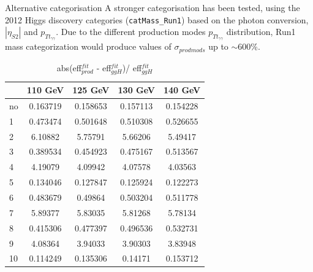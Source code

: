 \documentclass[10pt,UKenglish, leqno, xcolor = dvipsnames]{beamer}
\begin{document}
		\begin{frame}{Alternative categorisation}
			A stronger categorisation has been tested, using the 2012 Higgs discovery categories (\texttt{catMass\_Run1}) based on the photon conversion, $|\eta_{S2}|$ and $p_{Tt_{\gamma\gamma}}$. Due to the different production modes $p_{Tt_{\gamma\gamma}}$ distribution, Run1 mass categorization would produce values of $\sigma_{prod mods}$ up to $\sim$600\%.
			\begin{table}[tbp]
				\centering
				\small
				\begin{tabular}{lcccc}
					\toprule[1.5pt]
					& 110 GeV	& 125 GeV	& 130 GeV	& 140 GeV	\\
					\midrule
					no & 0.163719 & 0.158653 & 0.157113 & 0.154228	\\
					1 & 0.473474 & 0.501648 & 0.510308 & 0.526655	\\
					2 & 6.10882 & 5.75791 & 5.66206 & 5.49417		\\
					3 & 0.389534 & 0.454923 & 0.475167 & 0.513567	\\
					4 & 4.19079 & 4.09942 & 4.07578 & 4.03563		\\
					5 & 0.134046 & 0.127847 & 0.125924 & 0.122273	\\
					6 & 0.483679 & 0.49864 & 0.503204 & 0.511778	\\
					7 & 5.89377 & 5.83035 & 5.81268 & 5.78134		\\
					8 & 0.415306 & 0.477397 & 0.496536 & 0.532731	\\
					9 & 4.08364 & 3.94033 & 3.90303 & 3.83948		\\
					10 & 0.114249 & 0.135306 & 0.14171 & 0.153712	\\
					
					\bottomrule[1.5pt]
				\end{tabular}
				\caption{abs(eff$^{fit}_{prod}$ - eff$^{fit}_{ggH}$)/ eff$^{fit}_{ggH}$}
			\end{table}
		\end{frame}
	
\end{document}
